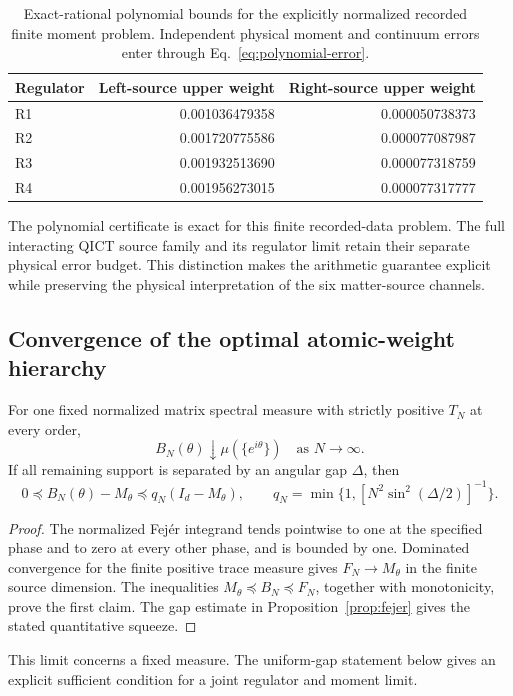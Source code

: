 \begin{table}[htbp]\centering\small
\caption{Exact-rational polynomial bounds for the explicitly normalized recorded finite moment problem. Independent physical moment and continuum errors enter through Eq.~\eqref{eq:polynomial-error}.}
\begin{tabular}{@{}lrr@{}}\toprule
Regulator & Left-source upper weight & Right-source upper weight\\\midrule
R1 & 0.001036479358 & 0.000050738373\\
R2 & 0.001720775586 & 0.000077087987\\
R3 & 0.001932513690 & 0.000077318759\\
R4 & 0.001956273015 & 0.000077317777\\
\bottomrule
\end{tabular}\label{tab:exact-rational}
\end{table}

The polynomial certificate is exact for this finite recorded-data problem. The full interacting QICT source family and its regulator limit retain their separate physical error budget. This distinction makes the arithmetic guarantee explicit while preserving the physical interpretation of the six matter-source channels.

\subsection{Convergence of the optimal atomic-weight hierarchy}
\begin{proposition}\label{prop:atom-limit}
For one fixed normalized matrix spectral measure with strictly positive $T_N$ at every order,
\[
B_N(\theta)\downarrow\mu(\{e^{i\theta}\})\quad\text{as }N\to\infty.
\]
If all remaining support is separated by an angular gap $\Delta$, then
\[
0\preceq B_N(\theta)-M_\theta\preceq q_N(I_d-M_\theta),
\qquad q_N=\min\{1,[N^2\sin^2(\Delta/2)]^{-1}\}.
\]
\end{proposition}
\begin{proof}
The normalized Fej\'er integrand tends pointwise to one at the specified phase and to zero at every other phase, and is bounded by one. Dominated convergence for the finite positive trace measure gives $F_N\to M_\theta$ in the finite source dimension. The inequalities $M_\theta\preceq B_N\preceq F_N$, together with monotonicity, prove the first claim. The gap estimate in Proposition~\ref{prop:fejer} gives the stated quantitative squeeze.
\end{proof}
This limit concerns a fixed measure. The uniform-gap statement below gives an explicit sufficient condition for a joint regulator and moment limit.

